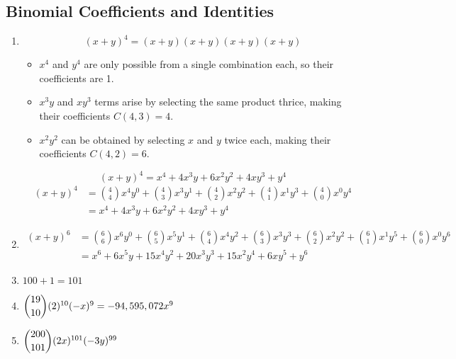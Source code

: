 \documentclass[12pt, A4]{article}
\begin{document}
		\subsection{Binomial Coefficients and Identities}
			\begin{enumerate}
				\item
					\begin{tasks}
						\task
							\[(x + y)^4 = (x + y)(x + y)(x + y)(x + y)\]
							\begin{itemize}[leftmargin = -0.25in]
								\item
									\(x^4\) and \(y^4\) are only possible from a single combination each, so their coefficients are 1.	
								\item
									\(x^3y\) and \(xy^3\) terms arise by selecting the same product thrice, making their coefficients \(C(4, 3) = 4\).
								\item
									\(x^2y^2\) can be obtained by selecting \(x\) and \(y\) twice each, making their coefficients \(C(4, 2) = 6\).
							\end{itemize}
							\[(x + y)^4 = x^4 + 4x^3y + 6x^2y^2 + 4xy^3 + y^4\]
						\task
							\begin{align*}
								(x + y)^4 &= \binom{4}{4}x^4y^0 + \binom{4}{3}x^3y^1 + \binom{4}{2}x^2y^2 + \binom{4}{1}x^1y^3 + \binom{4}{0}x^0y^4 \\
									&= x^4 + 4x^3y + 6x^2y^2 + 4xy^3 + y^4
							\end{align*}
					\end{tasks}
				\setcounter{enumi}{2}
				\item
					\begin{align*}
						(x + y)^6 &= \binom{6}{6}x^6y^0 + \binom{6}{5}x^5y^1 + \binom{6}{4}x^4y^2 + \binom{6}{3}x^3y^3 + \binom{6}{2}x^2y^2 + \binom{6}{1}x^1y^5 + \binom{6}{0}x^0y^6 \\
							&= x^6 + 6x^5y + 15x^4y^2 + 20x^3y^3 + 15x^2y^4 + 6xy^5 + y^6
					\end{align*}
				\setcounter{enumi}{4}
				\item
					\(100 + 1 = 101\)
				\setcounter{enumi}{6}
				\item
					\(\dbinom{19}{10}(2)^{10}(-x)^{9} = -94,595,072x^9\)
				\item
					\(\dbinom{200}{101}(2x)^{101}(-3y)^{99}\)
			\end{enumerate}
\end{document}
